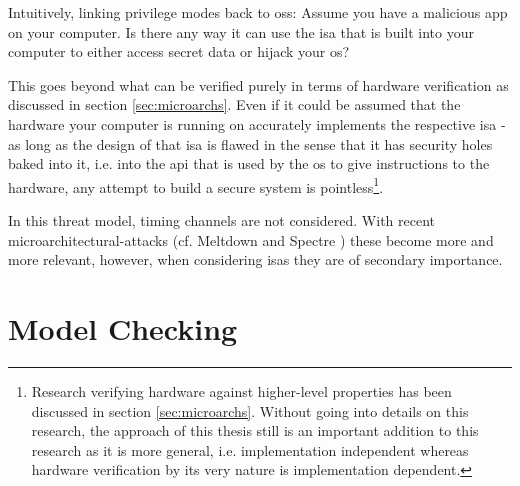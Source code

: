 Intuitively, linking privilege modes back to \glspl{os}: Assume you have a malicious app on your computer.
Is there any way it can use the \gls{isa} that is built into your computer to either access secret data or hijack your \gls{os}?

This goes beyond what can be verified purely in terms of hardware verification as discussed in section \ref{sec:microarchs}.
Even if it could be assumed that the hardware your computer is running on accurately implements the respective \gls{isa} - as long as the design of that \gls{isa} is flawed in the sense that it has security holes baked into it, i.e. into the \gls{api} that is used by the \gls{os} to give instructions to the hardware, any attempt to build a secure system is pointless\footnote{%
    Research verifying hardware against higher-level properties has been discussed in section \ref{sec:microarchs}.
    Without going into details on this research, the approach of this thesis still is an important addition to this research as it is more general, i.e. implementation independent whereas hardware verification by its very nature is implementation dependent.
}.

In this threat model, timing channels are not considered.
With recent microarchitectural-attacks (cf. Meltdown \cite{Lipp2018meltdown} and Spectre \cite{Kocher2018spectre}) these become more and more relevant, however, when considering \glspl{isa} they are of secondary importance.

\section{Model Checking}
\label{sec:model-checking}

